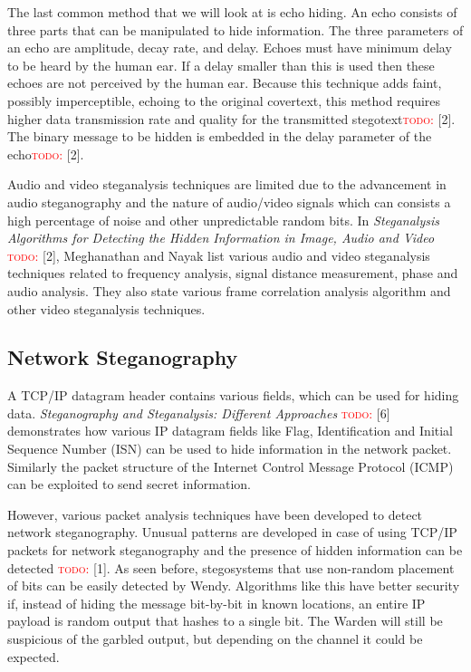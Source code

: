 \documentclass[11pt]{article}
\newcommand\todo[1]{\textcolor{red}{\textsc{todo}: #1}}
\begin{document}
The last common method that we will look at is echo hiding. An echo
consists of three parts that can be manipulated to hide information.
The three parameters of an echo are amplitude, decay rate, and delay.
Echoes must have minimum delay to be heard by the human ear. If a
delay smaller than this is used then these echoes are not perceived by
the human ear. Because this technique adds faint, possibly
imperceptible, echoing to the original covertext, this method requires
higher data transmission rate and quality for the transmitted
stegotext\todo{}[2]. The binary message to be hidden is embedded in the delay
parameter of the echo\todo{}[2].

Audio and video steganalysis techniques are limited due to the
advancement in audio steganography and the nature of audio/video
signals which can consists a high percentage of noise and other
unpredictable random bits. In \emph{Steganalysis Algorithms for Detecting
the Hidden Information in Image, Audio and Video} \todo{} [2], Meghanathan and
Nayak list various audio and video steganalysis techniques related to
frequency analysis, signal distance measurement, phase and audio
analysis. They also state various frame correlation analysis algorithm
and other video steganalysis techniques.

\subsection{Network Steganography}
A TCP/IP datagram header contains various fields, which can be used
for hiding data. \emph{Steganography and Steganalysis: Different
Approaches} \todo{}[6] demonstrates how various IP datagram fields
like Flag, Identification and Initial Sequence Number (ISN) can be
used to hide information in the network packet. Similarly the packet
structure of the Internet Control Message Protocol (ICMP) can be
exploited to send secret information.

However, various packet analysis techniques have been developed to
detect network steganography. Unusual patterns are developed in case
of using TCP/IP packets for network steganography and the presence of
hidden information can be detected \todo{} [1]. As seen before, stegosystems
that use non-random placement of bits can be easily detected by Wendy.
Algorithms like this have better security if, instead of hiding the
message bit-by-bit in known locations, an entire IP payload is random
output that hashes to a single bit. The Warden will still be
suspicious of the garbled output, but depending on the channel it
could be expected.
\end{document}
